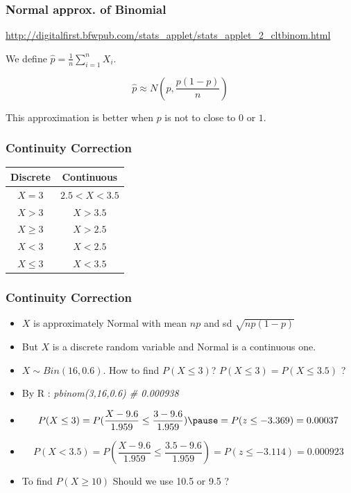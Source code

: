 \documentclass{beamer}\usepackage[]{graphicx}\usepackage[]{color}
\begin{document}
\begin{frame}[fragile]
\frametitle{Normal approx. of Binomial}

\url{http://digitalfirst.bfwpub.com/stats_applet/stats_applet_2_cltbinom.html}

We define $ \hat{p} = \frac{1}{n} \sum_{i=1}^{n} X_{i}$.

$$ \hat{p} \approx N \left (p, \frac{p(1-p)}{n} \right) $$

This approximation is better when $p$ is not to close to $0$ or $1$.

\end{frame}

\begin{frame}[fragile]
\frametitle{Continuity Correction}

\begin{tabular}{|c|c|}
\hline
Discrete & Continuous \\ \hline
$X=3$ & $2.5 < X < 3.5$ \\ \hline
$X > 3$ & $X > 3.5$ \\ \hline
$X \geq 3$ & $ X > 2.5 $ \\ \hline
$X < 3$ & $X < 2.5$ \\ \hline
$X \leq 3$ & $X < 3.5$ \\ \hline
\end{tabular}

\end{frame}

\begin{frame}[fragile]

\frametitle{Continuity Correction}

\begin{itemize}
\item $X$ is approximately Normal with mean $np$ and sd $\sqrt{np(1-p)}$ \pause
\item But $X$ is a discrete random variable and Normal is a continuous one. \pause
\item $X \sim Bin(16, 0.6 ) $. How to find $P( X \leq 3)$? \pause $P(X \leq 3)= P( X \leq 3.5)$ ? \pause
\item By R : \textit{ pbinom(3,16,0.6) \# 0.000938 } \pause
\item $$P( X \leq 3 )= P( \frac{X- 9.6}{1.959} \leq \frac{3-9.6}{1.959}) \pause = P(z \leq -3.369) = 0.00037$$ \pause
\item $$P( X < 3.5 )= P( \frac{X- 9.6}{1.959} \leq \frac{3.5-9.6}{1.959})  = P(z \leq -3.114) = 0.000923$$ \pause
\item To find $P(X \geq 10)$ Should we use 10.5 or 9.5 ? 
\end{itemize}

\end{frame}
\end{document}

